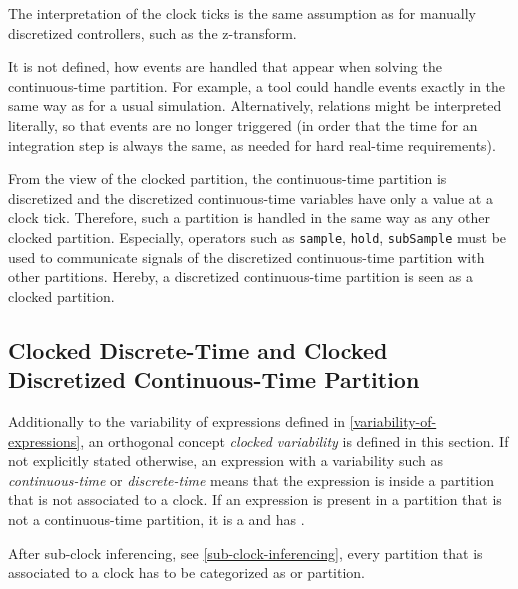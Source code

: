 \begin{nonnormative}
The interpretation of the clock ticks is the same assumption as for manually discretized controllers, such as the z-transform.
\end{nonnormative}

\begin{nonnormative}
It is not defined, how events are handled that appear when solving the continuous-time partition. For example, a tool could handle events exactly in the same way as for a usual
simulation.  Alternatively, relations might be interpreted literally, so that events are no longer triggered (in order that the time for an integration step is always the same,
as needed for hard real-time requirements).
\end{nonnormative}

From the view of the clocked partition, the continuous-time
partition is discretized and the discretized continuous-time variables
have only a value at a clock tick. Therefore, such a partition is
handled in the same way as any other clocked partition. Especially,
operators such as \lstinline!sample!, \lstinline!hold!, \lstinline!subSample! must be used to communicate
signals of the discretized continuous-time partition with other
partitions. Hereby, a discretized continuous-time partition is seen as a
clocked partition.


\subsection{Clocked Discrete-Time and Clocked Discretized Continuous-Time Partition}\label{clocked-discrete-time-and-clocked-discretized-continuous-time-partition}

Additionally to the variability of expressions defined in \cref{variability-of-expressions},
an orthogonal concept \emph{clocked variability} is defined in this
section. If not explicitly stated otherwise, an expression with a
variability such as \emph{continuous-time} or \emph{discrete-time} means that
the expression is inside a partition that is not associated to a clock.
If an expression is present in a partition that is not a continuous-time
partition, it is a  and has
.

After sub-clock inferencing, see \cref{sub-clock-inferencing}, every partition that is
associated to a clock has to be categorized as  or 
partition.

